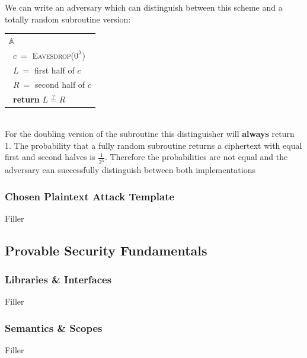 \documentclass{article}
\begin{document}
\begin{adjustwidth}{2em}{}
\begin{adjustwidth}{2em}{4em}
\begin{adjustwidth}{2em}{}
\begin{adjustwidth}{2em}{}
						We can write an adversary which can distinguish between this scheme and a totally random subroutine version:
						\begin{center}
							\begin{tabular}{|l|}
								\hline
								\cellcolor{gray!80} $\mathbb{A}$ \\
								\ $c \ =$ \textsc{Eavesdrop}($0^{\lambda}$) \\
								\ $L \ =$ first half of $c$ \\
								\ $R \ =$ second half of $c$ \\
								\ \textbf{return} $L \stackrel{?}{=} R$	\\										\hline
							\end{tabular}
						\end{center}
						\hfill \\
						For the doubling version of the subroutine this distinguisher will \textbf{always} return 1. The probability that a fully random subroutine returns a ciphertext with equal first and second halves is $\frac{1}{2^{\lambda}}$. Therefore the probabilities are not equal and the adversary can successfully distinguish between both implementations
					\end{adjustwidth}
				\end{adjustwidth}
				\subsubsection{Chosen Plaintext Attack Template}
				\begin{adjustwidth}{2em}{}
				Filler
				\end{adjustwidth}
			\end{adjustwidth}
			\subsection{Provable Security Fundamentals}
			\begin{adjustwidth}{2em}{}
				\subsubsection{Libraries \& Interfaces}
				\begin{adjustwidth}{2em}{}
				Filler
				\end{adjustwidth}
				\subsubsection{Semantics \& Scopes}
				\begin{adjustwidth}{2em}{}
				Filler
				\end{adjustwidth}

\end{adjustwidth}
\end{adjustwidth}
\end{document}
